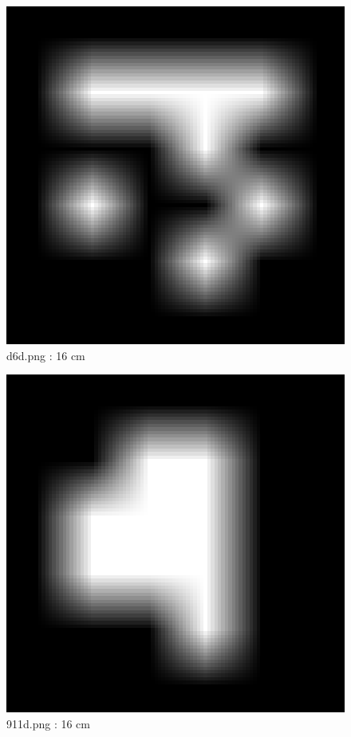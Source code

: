 \documentclass[11pt,a4,BCOR=0cm]{scrartcl}
\begin{document}
\newpage
\begin{figure}
  \begin{center}
    \includegraphics[natwidth=6,natheight=6,width=16cm]{d6d.png}
    \caption{d6d.png : 16 cm}
    \label{fig:d6d.png}
  \end{center}
\end{figure}
\newpage
\begin{figure}
  \begin{center}
    \includegraphics[natwidth=6,natheight=6,width=16cm]{911d.png}
    \caption{911d.png : 16 cm}
    \label{fig:911d.png}
  \end{center}
\end{figure}
\end{document}
